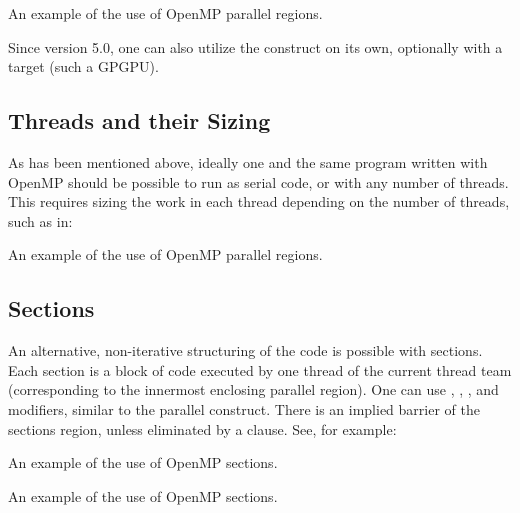\raggedbottom
\begin{codebox}[]{\href{https://godbolt.org/z/Ejh5EfPqj}{\ExternalLink}}
\footnotesize An example of the use of OpenMP parallel regions.
\tcblower
{}
\end{codebox}

Since version 5.0, one can also utilize the  construct on its own, optionally with a target (such a GPGPU). 

\subsection{Threads and their Sizing}

As has been mentioned above, ideally one and the same program written with OpenMP should be possible to run as serial code, or with any number of threads. 
This requires sizing the work in each thread depending on the number of threads, such as in:

\raggedbottom
\begin{codebox}[]{\href{https://godbolt.org/z/vTx9Mxzno}{\ExternalLink}}
\footnotesize An example of the use of OpenMP parallel regions.
\tcblower
{}
\end{codebox}

\subsection{Sections}

An alternative, non-iterative structuring of the code is possible with sections.
Each section is a block of code executed by one thread of the current thread team (corresponding to the innermost enclosing parallel region). 
One can use , , , and  modifiers, similar to the parallel construct. 
There is an implied barrier of the sections region, unless eliminated by a  clause.
See, for example:

\raggedbottom
\begin{codebox}[]{\href{https://godbolt.org/z/PrEPzhsGn}{\ExternalLink}}
\footnotesize An example of the use of OpenMP sections.
\tcblower
{}
\end{codebox}

\raggedbottom
\begin{codebox}[]{\href{https://godbolt.org/z/fTsv1qz4K}{\ExternalLink}}
\footnotesize An example of the use of OpenMP sections.
\tcblower
{}
\end{codebox}


